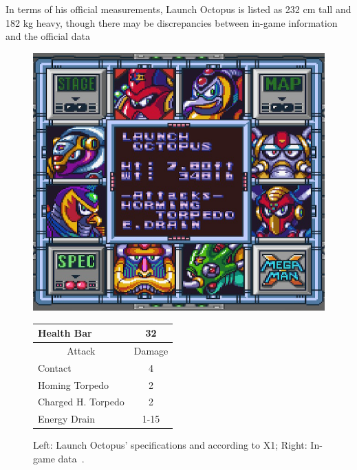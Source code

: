In terms of his official measurements, Launch Octopus is listed as 232 cm tall and 182 kg heavy\cite{wayback:X_resources}, though there may be discrepancies between in-game information and the official data~\cite{wiki:Launch_octopus}


\begin{figure}[htp]
	\begin{minipage}[c]{0.45\linewidth}
		\vspace{0pt}
		\centering
		\includegraphics[width=\linewidth]{figures/X1/Launch_octopus/Launch_octopus_specs.png}
	\end{minipage}
	\begin{minipage}[c]{0.45\linewidth}
		\centering
		\vspace{0pt}
		\begin{tabular}[h]{l c}
			\toprule
			Health Bar & 32\\
			\midrule
			\multicolumn{1}{c}{Attack} & \multicolumn{1}{c}{Damage}\\
			Contact & 4\\
			Homing Torpedo & 2\\
			Charged H. Torpedo & 2\\
			Energy Drain & 1-15\\
			\bottomrule
		\end{tabular}
	\end{minipage}
	\caption{Left: Launch Octopus' specifications and according to X1; Right: In-game data~\cite{wiki:Launch_octopus}. }
	\label{Octopus_specs}
\end{figure}


